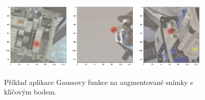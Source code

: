 \begin{figure}[H]
\centering
\includegraphics[width=0.3\textwidth,keepaspectratio]{Figures/kp_examples/kp_example_00.png}
\includegraphics[width=0.3\textwidth,keepaspectratio]{Figures/kp_examples/kp_example_01.png}
\includegraphics[width=0.3\textwidth,keepaspectratio]{Figures/kp_examples/kp_example_02.png}
\caption[Příklad aplikace Gaussovy funkce na snímky s klíčovým bodem]{Příklad aplikace Gaussovy funkce na augmentované snímky s klíčovým bodem.}
\label{fig:kp_examples}
\end{figure}

\endinput